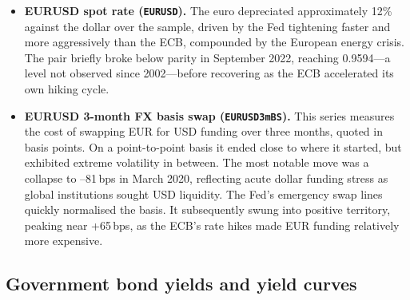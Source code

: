 \begin{itemize}
  \item \textbf{EURUSD spot rate (\texttt{EURUSD}).}
    The euro depreciated approximately 12\% against the dollar over the sample,
    driven by the Fed tightening faster and more aggressively than the ECB,
    compounded by the European energy crisis. The pair briefly broke below
    parity in September 2022, reaching 0.9594---a level not observed since
    2002---before recovering as the ECB accelerated its own hiking cycle.

  \item \textbf{EURUSD 3-month FX basis swap (\texttt{EURUSD3mBS}).}
    This series measures the cost of swapping EUR for USD funding over three
    months, quoted in basis points. On a point-to-point basis it ended close
    to where it started, but exhibited extreme volatility in between. The most
    notable move was a collapse to --81\,bps in March 2020, reflecting acute
    dollar funding stress as global institutions sought USD liquidity.
    The Fed's emergency swap lines quickly normalised the basis. It
    subsequently swung into positive territory, peaking near +65\,bps, as the
    ECB's rate hikes made EUR funding relatively more expensive.
\end{itemize}

\subsection*{Government bond yields and yield curves}


